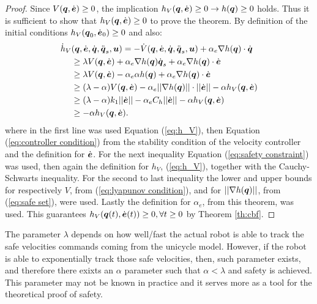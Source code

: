 \begin{proof}
    Since $V({\boldsymbol{q}},\dot{\boldsymbol{e}}) \geq 0$, the implication $h_V({\boldsymbol{q}},\dot{\boldsymbol{e}}) \geq 0 \rightarrow h({\boldsymbol{q}}) \geq 0$ holds. Thus it is sufficient to show that $h_V({\boldsymbol{q}},\dot{\boldsymbol{e}}) \geq 0$ to prove the theorem. By definition of the initial conditions $h_V({\boldsymbol{q}}_0,\dot{\boldsymbol{e}}_0) \geq 0$ and also:
    \begin{equation*}
        \begin{split}
            \dot{h}_V&({\boldsymbol{q}},\dot{\boldsymbol{e}},\dot{{\boldsymbol{q}}},\ddot{{\boldsymbol{q}}}_s,\boldsymbol{u}) = -\dot{V}({\boldsymbol{q}},\dot{\boldsymbol{e}},\dot{{\boldsymbol{q}}},\ddot{{\boldsymbol{q}}}_s,\boldsymbol{u}) + \alpha_e \nabla h({\boldsymbol{q}})\cdot\dot{{\boldsymbol{q}}} \\
            & \geq \lambda V({\boldsymbol{q}},\dot{\boldsymbol{e}}) + \alpha_e \nabla h({\boldsymbol{q}})\dot{{\boldsymbol{q}}}_s + \alpha_e \nabla h({\boldsymbol{q}})\cdot\dot{\boldsymbol{e}} \\
            & \geq \lambda V({\boldsymbol{q}},\dot{\boldsymbol{e}})  - \alpha_e \alpha h({\boldsymbol{q}}) + \alpha_e \nabla h({\boldsymbol{q}})\cdot\dot{\boldsymbol{e}} \\
            & \geq (\lambda-\alpha) V({\boldsymbol{q}},\dot{\boldsymbol{e}}) - \alpha_e ||\nabla h({\boldsymbol{q}})||\cdot||\dot{\boldsymbol{e}}|| - \alpha h_V({\boldsymbol{q}},\dot{\boldsymbol{e}}) \\
            & \geq (\lambda-\alpha) k_1 ||\dot{\boldsymbol{e}}|| - \alpha_e C_h ||\dot{\boldsymbol{e}}|| - \alpha h_V({\boldsymbol{q}},\dot{\boldsymbol{e}}) \\
            & \geq - \alpha h_V({\boldsymbol{q}},\dot{\boldsymbol{e}}).
        \end{split}
    \end{equation*}
    where in the first line was used Equation (\ref{eq:h_V}), then Equation (\ref{eq:controller condition}) from the stability condition of the velocity controller and the definition for $\dot{\boldsymbol{e}}$. For the next inequality Equation (\ref{eq:safety constraint}) was used, then again the definition for $h_V$, (\ref{eq:h_V}), together with the Cauchy-Schwarts inequality. For the second to last inequality the lower and upper bounds for respectively $V$, from (\ref{eq:lyapunov condition}), and for $||\nabla h({\boldsymbol{q}})||$, from (\ref{eq:safe set}), were used. Lastly the definition for $\alpha_e$, from this theorem, was used. This guarantees $h_V({\boldsymbol{q}}(t),\dot{\boldsymbol{e}}(t)) \geq 0, \forall t \geq 0$ by Theorem \ref{th:cbf}.
\end{proof}
\noindent
The parameter $\lambda$ depends on how well/fast the actual robot is able to track the safe velocities commands coming from the unicycle model. However, if the robot is able to exponentially track those safe velocities, then, such parameter exists, and therefore there exixts an $\alpha$ parameter such that $\alpha <\lambda$ and safety is achieved. This parameter may not be known in practice and it serves more as a tool for the theoretical proof of safety.\\ 
